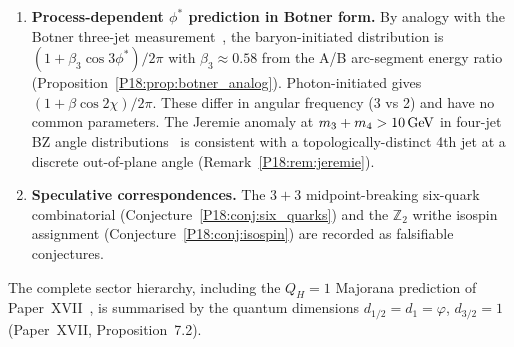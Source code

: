 \documentclass[11pt,a4paper]{article}
\theoremstyle{definition}\newtheorem{definition}[theorem]{Definition}
\theoremstyle{remark}
\newcommand{\vp}{\varphi}
\newcommand{\QH}{Q_H}
\newcommand{\Ztwo}{\mathbb{Z}_2}
\newcommand{\dimq}[1]{d_{#1}}
\newcommand{\phistar}{\phi^*}
\begin{document}
\begin{enumerate}[noitemsep]
\item \textbf{Process-dependent $\phistar$ prediction in Botner form.}
By analogy with the Botner three-jet measurement~\cite{Botner1992},
the baryon-initiated distribution is
$(1+\beta_3\cos 3\phistar)/2\pi$ with
$\beta_3\approx0.58$ from the A/B arc-segment energy ratio
(Proposition~\ref{P18:prop:botner_analog}).
Photon-initiated gives $(1+\beta\cos 2\chi)/2\pi$.
These differ in angular frequency (3 vs 2) and have no
common parameters.  The Jeremie anomaly at $m_3+m_4>10\,{\rm GeV}$
in four-jet BZ angle distributions~\cite{Jeremie2006} is consistent
with a topologically-distinct 4th jet at a discrete out-of-plane
angle (Remark~\ref{P18:rem:jeremie}).

\item \textbf{Speculative correspondences.}
The $3+3$ midpoint-breaking six-quark combinatorial
(Conjecture~\ref{P18:conj:six_quarks}) and the $\Ztwo$ writhe
isospin assignment (Conjecture~\ref{P18:conj:isospin}) are
recorded as falsifiable conjectures.
\end{enumerate}

The complete sector hierarchy, including the $\QH=1$ Majorana
prediction of Paper~XVII~\cite{Paper17}, is summarised by the quantum
dimensions $\dimq{1/2}=\dimq{1}=\vp$, $\dimq{3/2}=1$
(Paper~XVII, Proposition~7.2).
\end{document}

